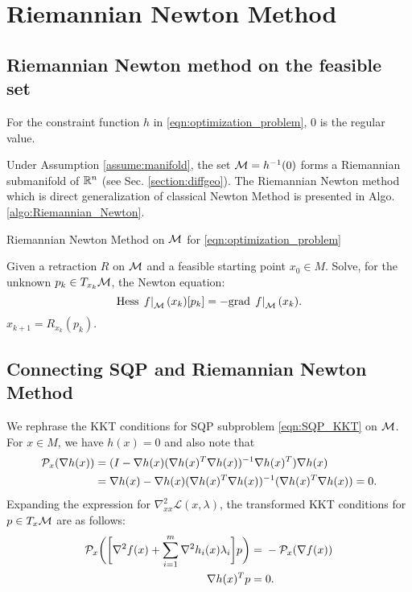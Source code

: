 \documentclass[11pt,a4paper]{article}
\begin{document}
\section{Riemannian Newton Method}

\subsection{Riemannian Newton method on the feasible set}

\begin{assume}\label{assume:manifold}
For the constraint function $h$ in \eqref{eqn:optimization_problem}, $0$ is the regular value.
\end{assume}

Under Assumption \ref{assume:manifold}, the set $\mathcal{M} = h^{-1}(0)$ forms a Riemannian submanifold of $\mathbb{R}^n$ (see Sec. \ref{section:diffgeo}). The Riemannian Newton method which is direct generalization of classical Newton Method is presented in Algo. \ref{algo:Riemannian_Newton}.

\begin{algorithm}
    \centering
    \caption{Riemannian Newton Method on $\mathcal{M}$ for \eqref{eqn:optimization_problem}}\label{algo:Riemannian_Newton}
    \begin{algorithmic}[1]
        \State Given a retraction $R$ on $\mathcal{M}$ and a feasible starting point $x_0\in M$.
            \State Solve, for the unknown $p_k \in T_{x_k}\mathcal{M}$, the Newton equation: 
            \begin{equation}\label{eqn:Riemannian_Newton_system}
            \text{Hess}\,\left.f\right|_{\mathcal{M}}(x_k)[p_k] = -\text{grad}\,\left.f\right|_{\mathcal{M}}(x_k).
            \end{equation}
            \State $x_{k+1} = R_{x_k}(p_k)$.
        \EndFor
    \end{algorithmic}
\end{algorithm}

\subsection{Connecting SQP and Riemannian Newton Method}

We rephrase the KKT conditions for SQP subproblem \eqref{eqn:SQP_KKT} on $\mathcal{M}$. For $x\in M$, we have $h(x) = 0$ and also note that 
\begin{align*}
\mathcal{P}_x(\nabla h(x)) =&\; (I - \nabla h(x)(\nabla h(x)^T\nabla h(x))^{-1}\nabla h(x)^T) \nabla h(x) \\
=&\; \nabla h(x) - \nabla h(x)(\nabla h(x)^T\nabla h(x))^{-1}(\nabla h(x)^T \nabla h(x)) = 0.
\end{align*}
Expanding the expression for $\nabla^2_{xx}\mathcal{L}(x,\lambda)$, the transformed KKT conditions for $p\in T_x\mathcal{M}$ are as follows:
\begin{align}
\mathcal{P}_x\bigg(\bigg[\nabla^2 f(x)+\sum_{i=1}^m\nabla^2 h_i(x)\lambda_i\bigg]p\bigg) =&\; -\mathcal{P}_x(\nabla f(x)) \nonumber \\
\nabla h(x)^Tp =&\; 0. \label{eqn:Riemannian_SQP_KKT}
\end{align}
\end{document}
